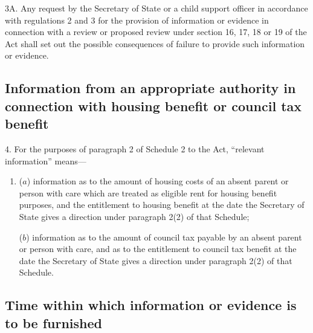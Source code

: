 \documentclass[a4paper,12pt]{article}
\begin{document}
3A.  Any request by the Secretary of State or a child support officer in accordance with regulations 2 and 3 for the provision of information or evidence in connection with a review or proposed review under section 16, 17, 18 or 19 of the Act shall set out the possible consequences of failure to provide such information or evidence.


\subsection[4. Information from an appropriate authority in connection with housing benefit or council tax benefit]{Information from an appropriate authority in connection with housing benefit or council tax benefit}

4.  For the purposes of paragraph 2 of Schedule 2 to the Act, “relevant information” means—
\begin{enumerate}\item[]
($a$) information as to the amount of housing costs of an absent parent or person with care which are treated as eligible rent for housing benefit purposes, and the entitlement to housing benefit at the date the Secretary of State gives a direction under paragraph 2(2) of that Schedule;

($b$) information as to the amount of council tax payable by an absent parent or person with care, and as to the entitlement to council tax benefit at the date the Secretary of State gives a direction under paragraph 2(2) of that Schedule.
\end{enumerate}

%

\subsection[5. Time within which information or evidence is to be furnished]{Time within which information or evidence is to be furnished}
\end{document}

